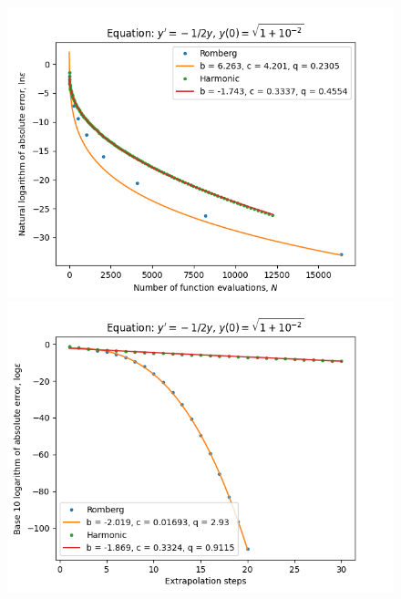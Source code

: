 \begin{figure}[H]
\centering
\begin{minipage}{0.45\textwidth}
\centering
\includegraphics[scale=0.45]{emr_plots/quad_sing_2_hp_trend.png}
\end{minipage}
\begin{minipage}{0.45\textwidth}
\centering
\includegraphics[scale=0.45]{emr_plots/quad_sing_2_hp_steps.png}
\end{minipage}
\end{figure}

